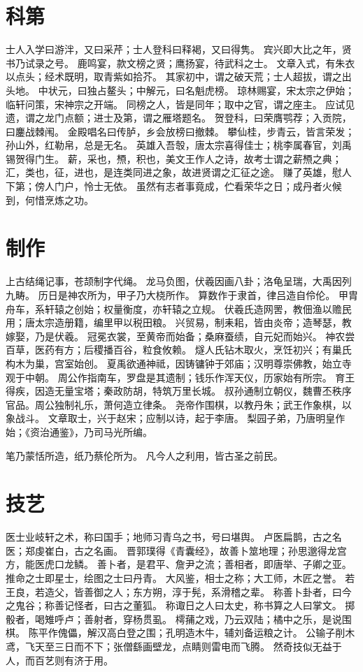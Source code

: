 \documentclass[12pt,UTF8]{ctexbook}
\begin{document}
\chapter{科第}

士人入学曰游泮，又曰采芹；士人登科曰释褐，又曰得隽。
宾兴即大比之年，贤书乃试录之号。
鹿鸣宴，款文榜之贤；鹰扬宴，待武科之士。
文章入式，有朱衣以点头；经术既明，取青紫如拾芥。
其家初中，谓之破天荒；士人超拔，谓之出头地。
中状元，曰独占鳌头；中解元，曰名魁虎榜。
琼林赐宴，宋太宗之伊始；临轩问策，宋神宗之开端。
同榜之人，皆是同年；取中之官，谓之座主。
应试见遗，谓之龙门点额；进士及第，谓之雁塔题名。
贺登科，曰荣膺鹗荐；入贡院，曰鏖战棘闱。
金殿唱名曰传胪，乡会放榜曰撤棘。
攀仙桂，步青云，皆言荣发；孙山外，红勒帛，总是无名。
英雄入吾彀，唐太宗喜得佳士；桃李属春官，刘禹锡贺得门生。
薪，采也，槱，积也，美文王作人之诗，故考士谓之薪槱之典；汇，类也，征，进也，是连类同进之象，故进贤谓之汇征之途。
赚了英雄，慰人下第；傍人门户，怜士无依。
虽然有志者事竟成，伫看荣华之日；成丹者火候到，何惜烹炼之功。

\chapter{制作}

上古结绳记事，苍颉制字代绳。
龙马负图，伏羲因画八卦；洛龟呈瑞，大禹因列九畴。
历日是神农所为，甲子乃大桡所作。
算数作于隶首，律吕造自伶伦。
甲胄舟车，系轩辕之创始；权量衡度，亦轩辕之立规。
伏羲氏造网罟，教佃渔以赡民用；唐太宗造册籍，编里甲以税田粮。
兴贸易，制耒耜，皆由炎帝；造琴瑟，教嫁娶，乃是伏羲。
冠冕衣裳，至黄帝而始备；桑麻蚕绩，自元妃而始兴。
神农尝百草，医药有方；后稷播百谷，粒食攸赖。
燧人氏钻木取火，烹饪初兴；有巢氏构木为巢，宫室始创。
夏禹欲通神祗，因铸镛钟于郊庙；汉明尊崇佛教，始立寺观于中朝。
周公作指南车，罗盘是其遗制；钱乐作浑天仪，历家始有所宗。
育王得疾，因造无量宝塔；秦政防胡，特筑万里长城。
叔孙通制立朝仪，魏曹丕秩序官品。周公独制礼乐，萧何造立律条。
尧帝作围棋，以教丹朱；武王作象棋，以象战斗。
文章取士，兴于赵宋；应制以诗，起于李唐。
梨园子弟，乃唐明皇作始；《资治通鉴》，乃司马光所编。

笔乃蒙恬所造，纸乃蔡伦所为。
凡今人之利用，皆古圣之前民。

\chapter{技艺}

医士业岐轩之术，称曰国手；地师习青乌之书，号曰堪舆。
卢医扁鹊，古之名医；郑虔崔白，古之名画。
晋郭璞得《青囊经》，故善卜筮地理；孙思邈得龙宫方，能医虎口龙鳞。
善卜者，是君平、詹尹之流；善相者，即唐举、子卿之亚。
推命之士即星士，绘图之士曰丹青。
大风鉴，相士之称；大工师，木匠之誉。
若王良，若造父，皆善御之人；东方朔，淳于髡，系滑稽之辈。
称善卜卦者，曰今之鬼谷；称善记怪者，曰古之董狐。
称诹日之人曰太史，称书算之人曰掌文。
掷骰者，喝雉呼卢；善射者，穿杨贯虱。
樗蒱之戏，乃云双陆；橘中之乐，是说围棋。
陈平作傀儡，解汉高白登之围；孔明造木牛，辅刘备运粮之计。
公输子削木鸢，飞天至三日而不下；张僧繇画壁龙，点睛则雷电而飞腾。
然奇技似无益于人，而百艺则有济于用。
\end{document}
